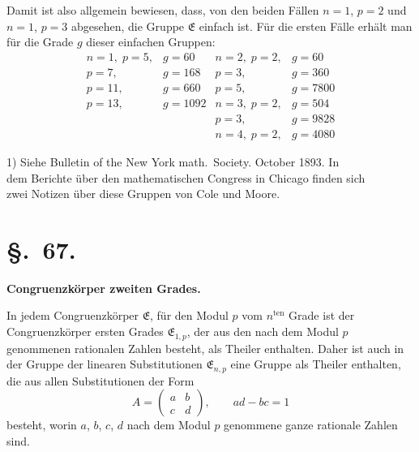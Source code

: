 \documentclass[12pt,a4paper]{article}
\newcommand{\sect}[1]{\section*{{\S.~#1.}}\addcontentsline{toc}{section}{\S.~#1}}
\begin{document}
Damit ist also allgemein bewiesen, dass, von den beiden Fällen $n = 1$, $p = 2$ und $n = 1$, $p = 3$ abgesehen, die Gruppe $\mathfrak{E}$ einfach ist. Für die ersten Fälle erhält man für die Grade $g$ dieser einfachen Gruppen:
\[
\begin{array}{ll|ll}
n = 1,\; p = 5, & g = 60 & n = 2,\; p = 2, & g = 60\\
p = 7, & g = 168 & p = 3, & g = 360\\
p = 11, & g = 660 & p = 5, & g = 7800\\
p = 13, & g = 1092 & n = 3,\; p = 2, & g = 504\\[4pt]
& & p = 3, & g = 9828\\
& & n = 4,\; p = 2, & g = 4080
\end{array}
\]
\begin{flushright}
\footnotesize
1) Siehe Bulletin of the New York math.\ Society. October 1893. In\\
dem Berichte über den mathematischen Congress in Chicago finden sich\\
zwei Notizen über diese Gruppen von Cole und Moore.
\end{flushright}



\newpage
\sect{67}
\begin{center}
\textbf{Congruenzkörper zweiten Grades.}
\end{center}
\label{sec:67}

In jedem Congruenzkörper $\mathfrak{E}$, für den Modul $p$ vom $n^{\text{ten}}$ Grade ist der Congruenzkörper ersten Grades $\mathfrak{E}_{1,p}$, der aus den nach dem Modul $p$ genommenen rationalen Zahlen besteht, als Theiler enthalten. Daher ist auch in der Gruppe der linearen Substitutionen $\mathfrak{E}_{n,p}$ eine Gruppe als Theiler enthalten, die aus allen Substitutionen der Form
\begin{equation}\label{eq:67.1}
\tag{1}
A = \begin{pmatrix}a&b\\c&d\end{pmatrix},\qquad ad - bc = 1
\end{equation}
besteht, worin $a$, $b$, $c$, $d$ nach dem Modul $p$ genommene ganze rationale Zahlen sind.
\end{document}
